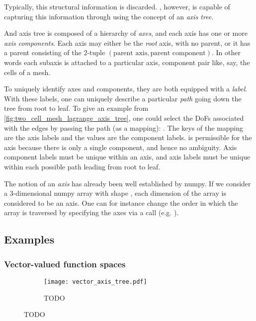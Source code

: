 \documentclass[thesis]{subfiles}
\begin{document}
Typically, this structural information is discarded.
, however, is capable of capturing this information through using the concept of an \textit{axis tree}.

And axis tree is composed of a hierarchy of \textit{axes}, and each axis has one or more \textit{axis components}.
Each axis may either be the \textit{root} axis, with no parent, or it has a parent consisting of the 2-tuple $(\textrm{parent axis}, \textrm{parent component})$.
In other words each subaxis is attached to a particular axis, component pair like, say, the cells of a mesh.

To uniquely identify axes and components, they are both equipped with a \textit{label}.
With these labels, one can uniquely describe a particular \textit{path} going down the tree from root to leaf.
To give an example from \cref{fig:two_cell_mesh_lagrange_axis_tree}, one could select the DoFs associated with the edges by passing the path (as a mapping): .
The keys of the mapping are the axis labels and the values are the component labels.
 is permissible for the  axis because there is only a single component, and hence no ambiguity.
Axis component labels must be unique within an axis, and axis labels must be unique within each possible path leading from root to leaf.

The notion of an \textit{axis} has already been well established by numpy.
If we consider a 3-dimensional numpy array with shape , each dimension of the array is considered to be an axis.
One can for instance change the order in which the array is traversed by specifying the axes via a  call (e.g. ).

\subsection{Examples}

\subsubsection{Vector-valued function spaces}

\begin{figure}
  \centering
  \begin{subfigure}{.6\textwidth}
    \centering
    \texttt{[image: vector\_axis\_tree.pdf]}
    \caption{TODO}
    \label{fig:vector_axis_tree}
  \end{subfigure}

\end{figure}
\end{document}
